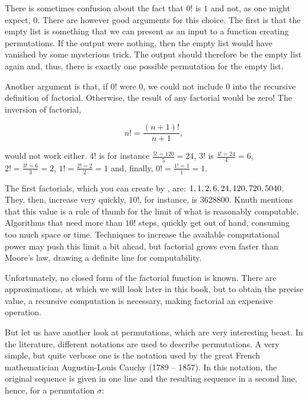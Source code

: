 \documentclass{scrreprt}
\newcommand{\texfamily}{\fontfamily{cmtex}\selectfont}
\newcommand{\Sp}{\hskip.33334em\relax}
\begin{document}
There is sometimes confusion about the fact
that $0!$ is $1$ and not,
as one might expect, $0$.
There are however good arguments for this choice.
The first is that the empty list
is something that we can present as an input
to a function creating permutations.
If the output were nothing,
then the empty list would have vanished
by some mysterious trick.
The output should therefore be the empty list again
and, thus, there is exactly one possible permutation
for the empty list.

Another argument is that,
if $0!$ were $0$,
we could not include $0$ into the recursive
definition of factorial.
Otherwise, the result of any factorial would be zero!
The inversion of factorial, \ie\

\begin{equation}
  n! = \frac{(n+1)!}{n+1},
\end{equation}

would not work either.
$4!$ is for instance 
$\frac{5! = 120}{5} = 24$,
$3!$ is $\frac{4!=24}{4} = 6$,
$2! = \frac{3!=6}{3} = 2$,
$1! = \frac{2!=2}{2} = 1$
and, finally, $0! = \frac{1!=1}{1} = 1$.

The first factorials,
which you can create by \text{\texfamily map\Sp fac\Sp [0..7]}, are:
$1, 1, 2, 6, 24, 120,\\ 720, 5040$.
They, then, increase very quickly,
$10!$, for instance, is \num{3628800}.
Knuth mentions that this value
is a rule of thumb for the limit
of what is reasonably computable.
Algorithms that need more than $10!$ steps,
quickly get out of hand,
consuming too much space or time.
Techniques to increase the available computational power
may push this limit a bit ahead,
but factorial grows even faster than Moore's law,
drawing a definite line for computability.

Unfortunately, no closed form of the factorial function
is known. There are approximations,
at which we will look later in this book,
but to obtain the precise value,
a recursive computation is necessary,
making factorial an expensive operation.

But let us have another look at permutations,
which are very interesting beast.
In the literature, different notations are used
to describe permutations. 
A very simple, but quite verbose one is
the  notation used by the 
great French mathematician Augustin-Louis Cauchy (1789 -- 1857).
In this notation, the original sequence is given in one line
and the resulting sequence in a second line, hence, 
for a permutation $\sigma$:
\end{document}
